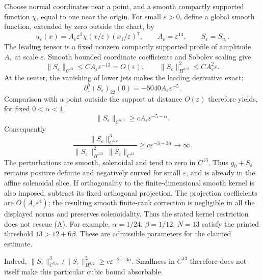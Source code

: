 \documentclass[10pt]{article}
\begin{document}
Choose normal coordinates near a point, and a smooth compactly supported function \(\chi\), equal to one near the origin. For small \(\varepsilon>0\), define a global smooth function, extended by zero outside the chart, by \[u_\varepsilon(x)
 =A_\varepsilon\varepsilon^2
   \chi(x/\varepsilon)(x_1/\varepsilon)^7,
 \qquad A_\varepsilon=\varepsilon^{14},
 \qquad S_\varepsilon=S_{u_\varepsilon}.\] The leading tensor is a fixed nonzero compactly supported profile of amplitude \(A_\varepsilon\) at scale \(\varepsilon\). Smooth bounded coordinate coefficients and Sobolev scaling give \[\|S_\varepsilon\|_{C^{13}}\le C A_\varepsilon\varepsilon^{-13}
       =O(\varepsilon),\qquad
 \|S_\varepsilon\|_{H^{3/2}}^2
       \le C A_\varepsilon^2\varepsilon.\] At the center, the vanishing of lower jets makes the leading derivative exact: \[\partial_1^5(S_\varepsilon)_{22}(0)
 =-5040 A_\varepsilon\varepsilon^{-5}.\] Comparison with a point outside the support at distance \(O(\varepsilon)\) therefore yields, for fixed \(0<\alpha<1\), \[\|S_\varepsilon\|_{C^{5,\alpha}}
 \ge c A_\varepsilon\varepsilon^{-5-\alpha}.\] Consequently \[\frac{\|S_\varepsilon\|_{C^{5,\alpha}}^3}
      {\|S_\varepsilon\|_{H^{3/2}}^2\,
       \|S_\varepsilon\|_{C^{13}}}
 \ge c\varepsilon^{-3-3\alpha}\longrightarrow\infty.
 \tag{B}\] The perturbations are smooth, solenoidal and tend to zero in \(C^{13}\). Thus \(g_0+S_\varepsilon\) remains positive definite and negatively curved for small \(\varepsilon\), and is already in the affine solenoidal slice. If orthogonality to the finite-dimensional smooth kernel is also imposed, subtract its fixed orthogonal projection. The projection coefficients are \(O(A_\varepsilon\varepsilon^4)\); the resulting smooth finite-rank correction is negligible in all the displayed norms and preserves solenoidality. Thus the stated kernel restriction does not rescue (A). For example, \(\alpha=1/24\), \(\beta=1/12\), \(N=13\) satisfy the printed threshold \(13>12+6\beta\). These are admissible parameters for the claimed estimate.\par
Indeed, \(\|S_\varepsilon\|_{C^{5,\alpha}}^3/
\|S_\varepsilon\|_{H^{3/2}}^2
\ge c\varepsilon^{-2-3\alpha}\). Smallness in \(C^{13}\) therefore does not itself make this particular cubic bound absorbable.\par
\end{document}
